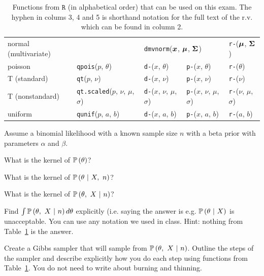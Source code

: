 \documentclass[12pt]{article}
\begin{document}
\begin{table}[htp]
\begin{tabular}{l | llll}
normal (multivariate) & 
& \multicolumn{2}{l}{\texttt{dmvnorm}($\boldsymbol{x}$, $\boldsymbol{\mu}$, $\boldsymbol{\Sigma}$)} 
& \texttt{r-}($\boldsymbol{\mu}$, $\boldsymbol{\Sigma}$) \\

poisson & \texttt{qpois}($p$, $\theta$) 
& \texttt{d-}($x$, $\theta$)
& \texttt{p-}($x$, $\theta$) 
& \texttt{r-}($\theta$) \\

T (standard) & \texttt{qt}($p$, $\nu$) 
& \texttt{d-}($x$, $\nu$) 
& \texttt{p-}($x$, $\nu$)
& \texttt{r-}($\nu$) \\

T (nonstandard) & \texttt{qt.scaled}($p$, $\nu$, $\mu$, $\sigma$) 
& \texttt{d-}($x$, $\nu$, $\mu$, $\sigma$)
& \texttt{p-}($x$, $\nu$, $\mu$, $\sigma$) 
& \texttt{r-}($\nu$, $\mu$, $\sigma$) \\

uniform & \texttt{qunif}($p$, $a$, $b$) 
& \texttt{d-}($x$, $a$, $b$)
& \texttt{p-}($x$, $a$, $b$) 
& \texttt{r-}($a$, $b$) \\
\end{tabular}
\caption{Functions from $\texttt{R}$ (in alphabetical order) that can be used on this exam. The hyphen in colums 3, 4 and 5 is shorthand notation for the full text of the r.v. which can be found in column 2.
}
\label{tab:eqs}
\end{table}

\problem Assume a binomial likelihood with a known sample size $n$ with a beta prior with parameters $\alpha$ and $\beta$.

\benum

 What is the kernel of $\mathbb{P}\left(\theta\right)$? 

 What is the kernel of $\mathbb{P}\left(\theta~|~X,~n\right)$? 

 What is the kernel of $\mathbb{P}\left(\theta,~X~|~n\right)$? 


 Find $\int \mathbb{P}\left(\theta,~X~|~n\right) d\theta$ explicitly (i.e. saying the answer is e.g. $\mathbb{P}\left(\theta~|~X\right)$ is unacceptable. You can use any notation we used in class. Hint: nothing from Table~\ref{tab:eqs} is the answer. 

 Create a Gibbs sampler that will sample from $\mathbb{P}\left(\theta,~X~|~n\right)$. Outline the steps of the sampler and describe explicitly how you do each step using functions from Table~\ref{tab:eqs}. You do not need to write about burning and thinning. 
\end{document}
